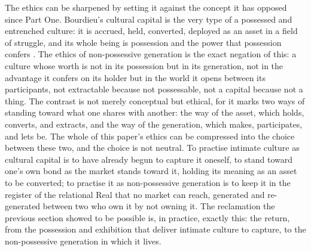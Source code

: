 The ethics can be sharpened by setting it against the concept it has opposed since Part One. Bourdieu's cultural capital is the very type of a possessed and entrenched culture: it is accrued, held, converted, deployed as an asset in a field of struggle, and its whole being is possession and the power that possession confers \parencite{bourdieu1986}. The ethics of non-possessive generation is the exact negation of this: a culture whose worth is not in its possession but in its generation, not in the advantage it confers on its holder but in the world it opens between its participants, not extractable because not possessable, not a capital because not a thing. The contrast is not merely conceptual but ethical, for it marks two ways of standing toward what one shares with another: the way of the asset, which holds, converts, and extracts, and the way of the generation, which makes, participates, and lets be. The whole of this paper's ethics can be compressed into the choice between these two, and the choice is not neutral. To practise intimate culture as cultural capital is to have already begun to capture it oneself, to stand toward one's own bond as the market stands toward it, holding its meaning as an asset to be converted; to practise it as non-possessive generation is to keep it in the register of the relational Real that no market can reach, generated and re-generated between two who own it by not owning it. The reclamation the previous section showed to be possible is, in practice, exactly this: the return, from the possession and exhibition that deliver intimate culture to capture, to the non-possessive generation in which it lives.
